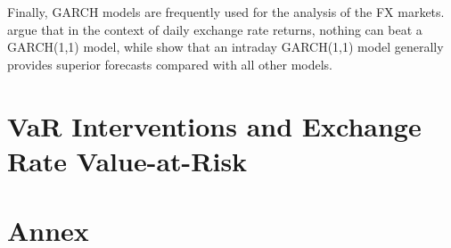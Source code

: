 \documentclass[11pt]{article}
\begin{document}
Finally,  GARCH  models  are  frequently  used for  the  analysis  of  the  FX
markets. \cite{hansen2005}  argue that in  the context of daily  exchange rate
returns, nothing can  beat a GARCH(1,1) model,  while \cite{mcmillan2012} show
that  an  intraday  GARCH(1,1)  model generally  provides  superior  forecasts
compared with all other models.\\

\section{VaR Interventions and Exchange Rate Value-at-Risk}
\label{sec:var-interventions}

\newpage
\singlespacing



\newpage
\appendix 
\section{Annex}

\end{document}

